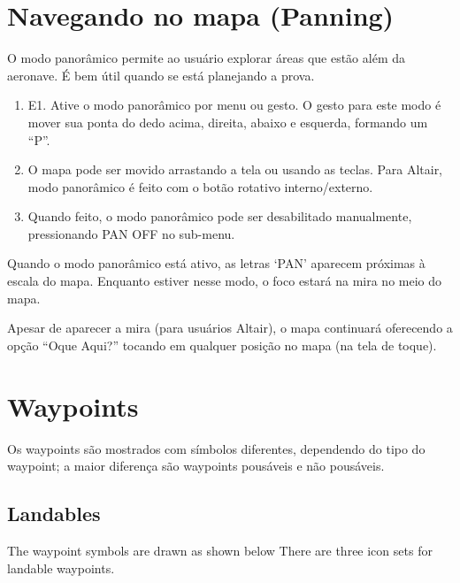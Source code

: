 \section{Navegando no mapa (Panning)}\label{sec:panning}

O modo panorâmico permite ao usuário explorar áreas que estão além da aeronave.  É bem útil quando se está planejando a prova.
\begin{enumerate}
\item E1.	Ative o modo panorâmico por menu ou gesto.  O gesto para este modo é mover sua ponta do dedo acima, direita, abaixo e esquerda, formando um “P”. 
\item O mapa pode ser movido arrastando a tela ou usando as teclas.  Para Altair, modo panorâmico é feito com o botão rotativo interno/externo.  
\item Quando feito, o modo panorâmico pode ser desabilitado manualmente, pressionando PAN OFF no sub-menu.
\end{enumerate} 

Quando o modo panorâmico está ativo, as letras ‘PAN’ aparecem próximas à escala do mapa.  Enquanto estiver nesse modo, o foco estará na mira no meio do mapa.

Apesar de aparecer a mira (para usuários Altair), o mapa continuará oferecendo a opção “Oque Aqui?” tocando em qualquer posição no mapa (na tela de toque). 


\section{Waypoints} \label{sec:waypoint-schemes}
Os waypoints são mostrados com símbolos diferentes, dependendo do tipo do waypoint; a maior diferença são waypoints pousáveis e não pousáveis.

\subsection*{Landables}
The waypoint symbols are drawn as shown below There are three icon sets for
landable waypoints. 


